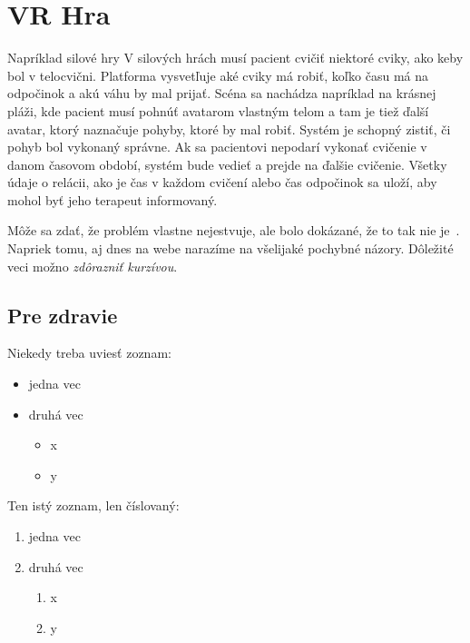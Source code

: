 \documentclass[10pt,twoside,slovak,a4paper]{article}
\begin{document}
\section{VR Hra} \label{VR rehabilitácie}
Napríklad
silové hry
V silových hrách musí pacient cvičiť niektoré cviky, ako keby bol v telocvični. Platforma vysvetľuje
aké cviky má robiť, koľko času má na odpočinok a akú váhu by mal prijať.
Scéna sa nachádza napríklad na krásnej pláži, kde pacient musí pohnúť avatarom vlastným telom a tam je
tiež ďalší avatar, ktorý naznačuje pohyby, ktoré by mal robiť.
Systém je schopný zistiť, či 
pohyb bol vykonaný správne. Ak sa pacientovi nepodarí vykonať cvičenie v danom časovom období,
systém bude vedieť a prejde na ďalšie cvičenie. Všetky údaje o relácii, ako je čas v každom cvičení alebo čas
odpočinok sa uloží, aby mohol byť jeho terapeut informovaný.


Môže sa zdať, že problém vlastne nejestvuje\cite{Coplien:MPD}, ale bolo dokázané, že to tak nie je~\cite{Czarnecki:Staged, Czarnecki:Progress}. Napriek tomu, aj dnes na webe narazíme na všelijaké pochybné názory\cite{PLP-Framework}. Dôležité veci možno \emph{zdôrazniť kurzívou}.

\subsection{Pre zdravie} \label{Pre zdravie}

Niekedy treba uviesť zoznam:

\begin{itemize}
\item jedna vec
\item druhá vec
	\begin{itemize}
	\item x
	\item y
	\end{itemize}
\end{itemize}

Ten istý zoznam, len číslovaný:

\begin{enumerate}
\item jedna vec
\item druhá vec
	\begin{enumerate}
	\item x
	\item y
	\end{enumerate}
\end{enumerate}
\end{document}
